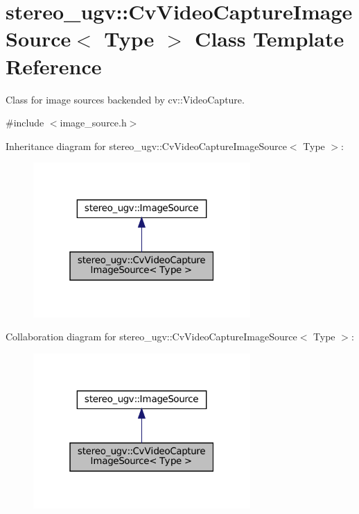 \hypertarget{classstereo__ugv_1_1CvVideoCaptureImageSource}{}\section{stereo\+\_\+ugv\+:\+:Cv\+Video\+Capture\+Image\+Source$<$ Type $>$ Class Template Reference}
\label{classstereo__ugv_1_1CvVideoCaptureImageSource}


Class for image sources backended by cv\+::\+Video\+Capture.  




{\ttfamily \#include $<$image\+\_\+source.\+h$>$}



Inheritance diagram for stereo\+\_\+ugv\+:\+:Cv\+Video\+Capture\+Image\+Source$<$ Type $>$\+:\nopagebreak
\begin{figure}[H]
\begin{center}
\leavevmode
\includegraphics[width=235pt]{classstereo__ugv_1_1CvVideoCaptureImageSource__inherit__graph}
\end{center}
\end{figure}


Collaboration diagram for stereo\+\_\+ugv\+:\+:Cv\+Video\+Capture\+Image\+Source$<$ Type $>$\+:\nopagebreak
\begin{figure}[H]
\begin{center}
\leavevmode
\includegraphics[width=235pt]{classstereo__ugv_1_1CvVideoCaptureImageSource__coll__graph}
\end{center}
\end{figure}
